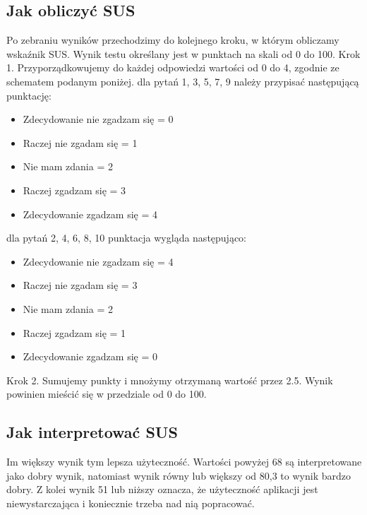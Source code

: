 \subsection{Jak obliczyć SUS}
Po zebraniu wyników przechodzimy do kolejnego kroku, w którym obliczamy wskaźnik SUS.\@
Wynik testu określany jest w punktach na skali od 0 do 100. \newline
Krok 1. Przyporządkowujemy do każdej odpowiedzi wartości od 0 do 4, zgodnie ze schematem podanym
poniżej. \newline
\newline
dla pytań 1, 3, 5, 7, 9 należy przypisać następującą punktację:
\begin{itemize}
    \item Zdecydowanie nie zgadzam się = 0
    \item Raczej nie zgadam się = 1
    \item Nie mam zdania = 2
    \item Raczej zgadzam się = 3
    \item Zdecydowanie zgadzam się = 4
\end{itemize}
dla pytań 2, 4, 6, 8, 10 punktacja wygląda następująco:
\begin{itemize}
    \item Zdecydowanie nie zgadzam się = 4
    \item Raczej nie zgadam się = 3
    \item Nie mam zdania = 2
    \item Raczej zgadzam się = 1
    \item Zdecydowanie zgadzam się = 0
\end{itemize}
Krok 2. Sumujemy punkty i mnożymy otrzymaną wartość przez 2.5.
Wynik powinien mieścić się w przedziale od 0 do 100.
\subsection{Jak interpretować SUS}
Im większy wynik tym lepsza użyteczność. Wartości powyżej 68 są interpretowane jako dobry wynik,
natomiast wynik równy lub większy od 80,3 to wynik bardzo dobry. Z kolei wynik 51 lub niższy oznacza, że
użyteczność aplikacji jest niewystarczająca i koniecznie trzeba nad nią popracować.~\cite{www_SUS}

